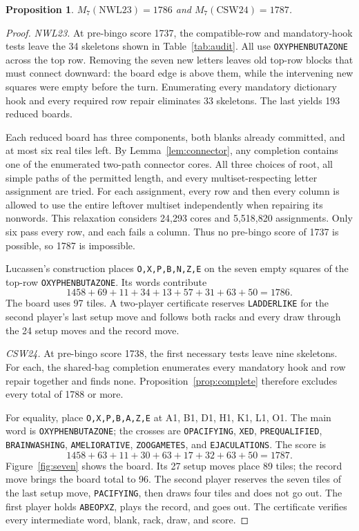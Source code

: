 \documentclass{article}
\theoremstyle{plain}
\newtheorem{proposition}[theorem]{Proposition}
\newcommand{\word}[1]{\texttt{#1}}
\begin{document}
\begin{proposition}\label{prop:seven}
$M_7(\mathrm{NWL23})=1786$ and $M_7(\mathrm{CSW24})=1787$.
\end{proposition}
\begin{proof}
\emph{NWL23.} At pre-bingo score 1737, the compatible-row and mandatory-hook
tests leave the 34 skeletons shown in Table~\ref{tab:audit}. All use
\word{OXYPHENBUTAZONE} across the top row. Removing the seven new letters
leaves old top-row blocks that must connect downward: the board edge is above
them, while the intervening new squares were empty before the turn. Enumerating
every mandatory dictionary hook and every required row repair eliminates 33
skeletons. The last yields 193 reduced boards.

Each reduced board has three components, both blanks already committed, and at
most six real tiles left. By Lemma~\ref{lem:connector}, any completion contains
one of the enumerated two-path connector cores. All three choices of root, all
simple paths of the permitted length, and every multiset-respecting letter
assignment are tried. For each assignment, every row and then every column is
allowed to use the entire leftover multiset independently when repairing its
nonwords. This relaxation considers 24,293 cores and 5,518,820 assignments.
Only six pass every row, and each fails a column. Thus no pre-bingo score of
1737 is possible, so 1787 is impossible.

Lucassen's construction places \word{O,X,P,B,N,Z,E} on the seven empty squares
of the top-row \word{OXYPHENBUTAZONE}. Its words contribute
\[
1458+69+11+34+13+57+31+63+50=1786.
\]
The board uses 97 tiles. A two-player certificate reserves
\word{LADDERLIKE} for the second player's last setup move and follows both
racks and every draw through the 24 setup moves and the record move.

\emph{CSW24.} At pre-bingo score 1738, the first necessary tests leave nine
skeletons. For each, the shared-bag completion enumerates every mandatory hook
and row repair together and finds none. Proposition~\ref{prop:complete}
therefore excludes every total of 1788 or more.

For equality, place \word{O,X,P,B,A,Z,E} at A1, B1, D1, H1, K1, L1, O1. The
main word is \word{OXYPHENBUTAZONE}; the crosses are \word{OPACIFYING},
\word{XED}, \word{PREQUALIFIED}, \word{BRAINWASHING},
\word{AMELIORATIVE}, \word{ZOOGAMETES}, and \word{EJACULATIONS}. The score is
\[
1458+63+11+30+63+17+32+63+50=1787.
\]
Figure~\ref{fig:seven} shows the board. Its 27 setup moves place 89 tiles; the
record move brings the board total to 96. The
second player reserves the seven tiles of the last setup move,
\word{PACIFYING}, then draws four tiles and does not go out. The first player
holds \word{ABEOPXZ}, plays the record, and goes out. The certificate verifies
every intermediate word, blank, rack, draw, and score.
\end{proof}
\end{document}

